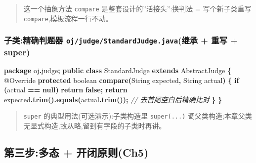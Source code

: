 \documentclass[
  11pt,
]{ctexart}
\newenvironment{Shaded}{\begin{snugshade}}{\end{snugshade}}
\newcommand{\AttributeTok}[1]{\textcolor[rgb]{0.13,0.29,0.53}{#1}}
\newcommand{\BuiltInTok}[1]{#1}
\newcommand{\CommentTok}[1]{\textcolor[rgb]{0.56,0.35,0.01}{\textit{#1}}}
\newcommand{\ControlFlowTok}[1]{\textcolor[rgb]{0.13,0.29,0.53}{\textbf{#1}}}
\newcommand{\DataTypeTok}[1]{\textcolor[rgb]{0.13,0.29,0.53}{#1}}
\newcommand{\FunctionTok}[1]{\textcolor[rgb]{0.13,0.29,0.53}{\textbf{#1}}}
\newcommand{\ImportTok}[1]{#1}
\newcommand{\KeywordTok}[1]{\textcolor[rgb]{0.13,0.29,0.53}{\textbf{#1}}}
\newcommand{\NormalTok}[1]{#1}
\newcommand{\OperatorTok}[1]{\textcolor[rgb]{0.81,0.36,0.00}{\textbf{#1}}}
\begin{document}
\begin{quote}
这一个抽象方法 \texttt{compare} 是整套设计的''活接头'':换判法 =
写个新子类重写 \texttt{compare},模板流程一行不动。
\end{quote}

\hypertarget{ux5b50ux7c7bux7cbeux786eux5224ux9898ux5668-ojjudgestandardjudge.javaux7ee7ux627f-ux91cdux5199-super}{%
\subsubsection{\texorpdfstring{子类:精确判题器
\texttt{oj/judge/StandardJudge.java}(继承 + 重写 +
super)}{子类:精确判题器 oj/judge/StandardJudge.java(继承 + 重写 + super)}}\label{ux5b50ux7c7bux7cbeux786eux5224ux9898ux5668-ojjudgestandardjudge.javaux7ee7ux627f-ux91cdux5199-super}}

\begin{Shaded}
\begin{Highlighting}[]
\KeywordTok{package}\ImportTok{ oj}\OperatorTok{.}\ImportTok{judge}\OperatorTok{;}
\KeywordTok{public} \KeywordTok{class}\NormalTok{ StandardJudge }\KeywordTok{extends}\NormalTok{ AbstractJudge }\OperatorTok{\{}
    \AttributeTok{@Override}
    \KeywordTok{protected} \DataTypeTok{boolean} \FunctionTok{compare}\OperatorTok{(}\BuiltInTok{String}\NormalTok{ expected}\OperatorTok{,} \BuiltInTok{String}\NormalTok{ actual}\OperatorTok{)} \OperatorTok{\{}
        \ControlFlowTok{if} \OperatorTok{(}\NormalTok{actual }\OperatorTok{==} \KeywordTok{null}\OperatorTok{)} \ControlFlowTok{return} \KeywordTok{false}\OperatorTok{;}
        \ControlFlowTok{return}\NormalTok{ expected}\OperatorTok{.}\FunctionTok{trim}\OperatorTok{().}\FunctionTok{equals}\OperatorTok{(}\NormalTok{actual}\OperatorTok{.}\FunctionTok{trim}\OperatorTok{());}      \CommentTok{// 去首尾空白后精确比对}
    \OperatorTok{\}}
\OperatorTok{\}}
\end{Highlighting}
\end{Shaded}

\begin{quote}
\texttt{super} 的典型用法(可选演示):子类构造里 \texttt{super(...)}
调父类构造;本章父类无显式构造,故从略,留到有字段的子类时再讲。
\end{quote}

\hypertarget{ux7b2cux4e09ux6b65ux591aux6001-ux5f00ux95edux539fux5219ch5}{%
\subsection{第三步:多态 +
开闭原则(Ch5)}\label{ux7b2cux4e09ux6b65ux591aux6001-ux5f00ux95edux539fux5219ch5}}
\end{document}
